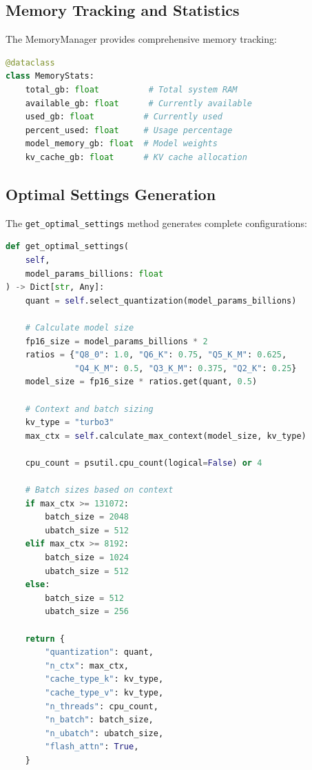 \subsection{Memory Tracking and Statistics}

The MemoryManager provides comprehensive memory tracking:

\begin{lstlisting}[language=Python, caption=Memory Statistics]
@dataclass
class MemoryStats:
    total_gb: float          # Total system RAM
    available_gb: float      # Currently available
    used_gb: float          # Currently used
    percent_used: float     # Usage percentage
    model_memory_gb: float  # Model weights
    kv_cache_gb: float      # KV cache allocation
\end{lstlisting}

\subsection{Optimal Settings Generation}

The \texttt{get\_optimal\_settings} method generates complete configurations:

\begin{lstlisting}[language=Python, caption=Optimal Settings Generation]
def get_optimal_settings(
    self,
    model_params_billions: float
) -> Dict[str, Any]:
    quant = self.select_quantization(model_params_billions)
    
    # Calculate model size
    fp16_size = model_params_billions * 2
    ratios = {"Q8_0": 1.0, "Q6_K": 0.75, "Q5_K_M": 0.625,
              "Q4_K_M": 0.5, "Q3_K_M": 0.375, "Q2_K": 0.25}
    model_size = fp16_size * ratios.get(quant, 0.5)
    
    # Context and batch sizing
    kv_type = "turbo3"
    max_ctx = self.calculate_max_context(model_size, kv_type)
    
    cpu_count = psutil.cpu_count(logical=False) or 4
    
    # Batch sizes based on context
    if max_ctx >= 131072:
        batch_size = 2048
        ubatch_size = 512
    elif max_ctx >= 8192:
        batch_size = 1024
        ubatch_size = 512
    else:
        batch_size = 512
        ubatch_size = 256
    
    return {
        "quantization": quant,
        "n_ctx": max_ctx,
        "cache_type_k": kv_type,
        "cache_type_v": kv_type,
        "n_threads": cpu_count,
        "n_batch": batch_size,
        "n_ubatch": ubatch_size,
        "flash_attn": True,
    }
\end{lstlisting}

